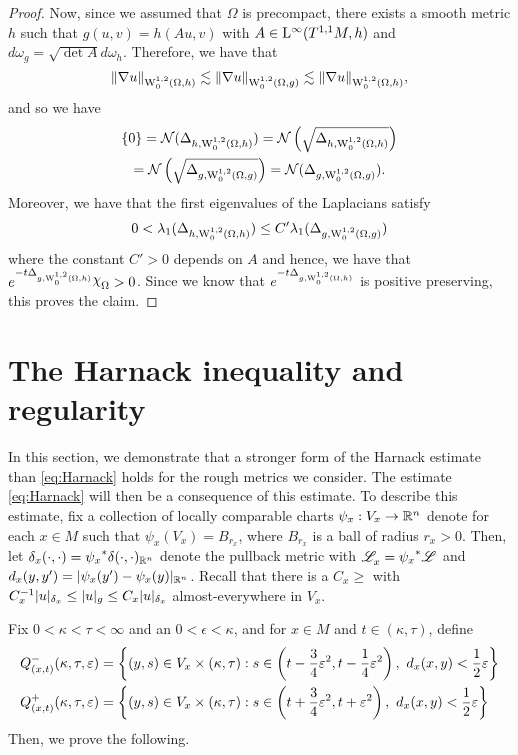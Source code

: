 \documentclass[a4paper, 12pt]{amsart}
\begin{document}
\begin{proof}
Now, since we assumed that $\Omega$ is precompact,
there exists a smooth metric $h$ such that
$g(u,v) = h(Au,v)$ with $A \in \Lp{\infty}(T^{1,1}M, h)$
and $d\omega_g = \sqrt{\det A} d\omega_h$.
Therefore, we have that
$$ \norm{\nabla  u}_{\SobH[0]{1}(\Omega,h)} 
	\lesssim \norm{\nabla u}_{\SobH[0]{1}(\Omega,g)}
	\lesssim \norm{\nabla u}_{\SobH[0]{1}(\Omega,h)},$$
and so we have 
\begin{multline*}
\set{0} = \nul(\Delta_{h, \SobH[0]{1}(\Omega,h)}) 
	= \nul\cbrac{\sqrt{\Delta_{h, \SobH[0]{1}(\Omega,h)}}} \\
	= \nul\cbrac{\sqrt{\Delta_{g, \SobH[0]{1}(\Omega,g)}}}
	= \nul(\Delta_{g, \SobH[0]{1}(\Omega,g)}).
\end{multline*}
Moreover, we have that 
the first eigenvalues of the Laplacians satisfy
$$0 < \lambda_1(\Delta_{h,\SobH[0]{1}(\Omega,h)}) \leq 
	C' \lambda_1(\Delta_{g, \SobH[0]{1}(\Omega,g)})$$
where the constant $C' > 0$ depends on $A$
and hence, we have that $e^{-t\Delta_{g,\SobH[0]{1}(\Omega,h)}}\ind{\Omega} > 0$.
Since we know that $e^{-t\Delta_{g,\SobH[0]{1}(\Omega,h)}}$
is positive preserving, this proves
the claim.
\end{proof}  

\section{The Harnack inequality and regularity}
\label{sec:harnack}


In this section, we demonstrate that a
 stronger form of the  Harnack 
estimate than \eqref{eq:Harnack} holds for the rough 
metrics we consider. The estimate \eqref{eq:Harnack} 
will then be a consequence of this estimate.
To describe this estimate, fix a collection of 
locally comparable charts $\psi_x:V_x \to \R^n$ denote
for each $x \in M$ such that $\psi_x(V_x) = B_{r_x}$,
where $B_{r_x}$ is a ball of radius $r_x > 0$. 
Then, let
$\delta_x(\cdot, \cdot) = \pullb{\psi_x}\delta(\cdot, \cdot)_{\R^n}$
denote the pullback metric with $\Leb_x = \pullb{\psi_x}\Leb$
and $d_x(y,y') = \modulus{\psi_x(y') - \psi_x(y)}_{\R^n}$.
Recall that there is a $C_x \geq $
with $C_x^{-1}  \modulus{u}_{\delta_x} \leq \modulus{u}_g \leq C_x \modulus{u}_{\delta_x}$
almost-everywhere in $V_x$.

Fix $0 < \kappa < \tau < \infty$ and an $0 < \epsilon < \kappa$,
and for $x \in M$ and $t \in (\kappa, \tau)$, define
\begin{equation}
\label{eq:paradef}
\begin{split} 
Q^-_{(x,t)}(\kappa, \tau, \epsilon) &= \set{(y,s) \in V_x \times (\kappa,\tau): s \in \cbrac{t - \frac{3}{4}\epsilon^2, t - \frac{1}{4} \epsilon^2},\ 
	d_x(x,y) < \frac{1}{2} \epsilon} \\
Q^+_{(x,t)}(\kappa, \tau, \epsilon) &= \set{(y,s) \in V_x \times (\kappa,\tau): s \in \cbrac{t + \frac{3}{4}\epsilon^2, t + \epsilon^2},\ 
	d_x(x,y) < \frac{1}{2} \epsilon}
\end{split}
\end{equation}
Then, we prove the following. 
\end{document}
